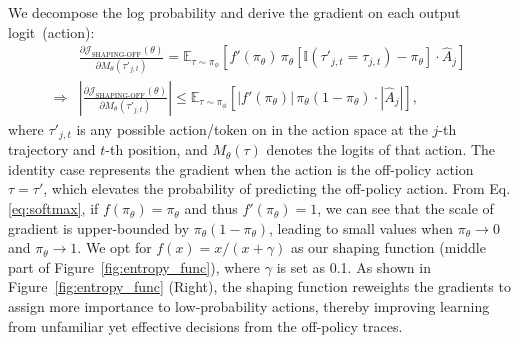 \documentclass{article}
\begin{document}
We decompose the log probability and derive the gradient on each output logit~(action): 
\begin{equation}
\begin{aligned}
    &\frac{\partial \mathcal{J}_{\text{SHAPING-OFF}}(\theta)}{\partial M_\theta(\tau'_{j,t})} = \mathbb{E}_{\tau \sim \pi_{\phi}}\left[
        f'(\pi_{\theta}) \, \pi_{\theta} \left[ \mathbb{I}(\tau'_{j,t} = \tau_{j,t}) - \pi_{\theta} \right] 
     \cdot \hat{A}_j \right]
     \\
    \Rightarrow& |\frac{\partial \mathcal{J}_{\text{SHAPING-OFF}}(\theta)}{\partial M_\theta(\tau'_{j,t})}|  \leq  \mathbb{E}_{\tau \sim \pi_{\phi}}\left[
        |f'(\pi_{\theta})| \, \pi_{\theta} \left( 1 - \pi_{\theta} \right)  \cdot |\hat{A}_j| \right],
\end{aligned}
\label{eq:softmax}
\end{equation}
where $\tau'_{j,t}$ is any possible action/token on in the action space at the $j$-th trajectory and $t$-th position, and $M_{\theta}(\tau)$ denotes the logits of that action. 
The identity case represents the gradient when the action is the off-policy action $\tau=\tau'$, which elevates the probability of predicting the off-policy action.
From Eq. \ref{eq:softmax}, if $f(\pi_\theta) = \pi_\theta$ and thus $f'(\pi_\theta)=1$, we can see that the scale of gradient is upper-bounded by $\pi_{\theta}(1-\pi_{\theta})$, leading to small values when $\pi_{\theta}\to 0$ and $\pi_{\theta}\to 1$. 
We opt for $f(x) = x/(x+\gamma)$ as our shaping function (middle part of Figure~\ref{fig:entropy_func}), where $\gamma$ is set as 0.1. 
As shown in Figure~\ref{fig:entropy_func} (Right), the shaping function reweights the gradients to assign more importance to low-probability actions, thereby improving learning from unfamiliar yet effective decisions from the off-policy traces.
\end{document}
